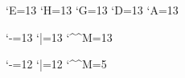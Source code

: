 


\def\changeCatcodes{%
    \catcode`E=13
    \catcode`H=13
    \catcode`G=13
    \catcode`D=13
    \catcode`A=13
}

\def\changeSpecialCatcodes{%
    \catcode`-=13
    \catcode`|=13
    \catcode`\^^M=13
}

\def\changeBackSpecialCatcodes{%
    \catcode`-=12
    \catcode`|=12
    \catcode`\^^M=5
}

\begingroup
\changeCatcodes
{}
\endgroup

\gdef\tune#1{.\hbox to 10pt{#1}}

\gdef\writebar{\raisebox{-.4ex}{\rule{.3ex}{2.5ex}}}

\gdef\gettext#1{(--- this is the text: #1 ---)}

\gdef\extendstring{\raisebox{.8ex}{\rule{.8em}{.5pt}}}



\gdef\newstring{\penalty-10000}

\gdef\makevbox#1{\vbox{#1}}

\changeSpecialCatcodes
\def\mytabenv{%
    \begingroup
    \showoutput
    \showboxdepth=3
    \setlength{\parindent}{0pt}
    \baselineskip=0pt\lineskiplimit=0pt\lineskip=0pt\relax
    \changeSpecialCatcodes
    \let-\extendstring
    \let|\writebar
    \let^^M\newstring

    \changeCatcodes
}
\changeBackSpecialCatcodes

\def\endmytabenv{\endgroup}

